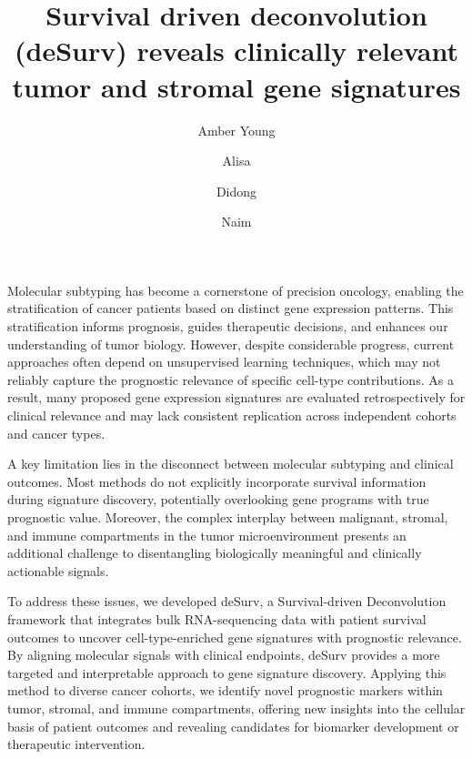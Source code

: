 \documentclass[9pt,twocolumn,twoside,]{pnas-new}
\title{Survival driven deconvolution (deSurv) reveals clinically
relevant tumor and stromal gene signatures}
\author[a,1,2]{Amber Young}
\author[b]{Alisa}
\author[a]{Didong}
\author[a,c]{Naim}
\affil[a]{University of North Carolina at Chapel Hill, Department,
Street, City, State, Zip}
\affil[b]{Another University Department, Street, City, State, Zip}
\begin{document}
\verticaladjustment{-2pt}



\maketitle
\thispagestyle{firststyle}



Molecular subtyping has become a cornerstone of precision oncology,
enabling the stratification of cancer patients based on distinct gene
expression patterns. This stratification informs prognosis, guides
therapeutic decisions, and enhances our understanding of tumor biology.
However, despite considerable progress, current approaches often depend
on unsupervised learning techniques, which may not reliably capture the
prognostic relevance of specific cell-type contributions. As a result,
many proposed gene expression signatures are evaluated retrospectively
for clinical relevance and may lack consistent replication across
independent cohorts and cancer types.

A key limitation lies in the disconnect between molecular subtyping and
clinical outcomes. Most methods do not explicitly incorporate survival
information during signature discovery, potentially overlooking gene
programs with true prognostic value. Moreover, the complex interplay
between malignant, stromal, and immune compartments in the tumor
microenvironment presents an additional challenge to disentangling
biologically meaningful and clinically actionable signals.

To address these issues, we developed deSurv, a Survival-driven
Deconvolution framework that integrates bulk RNA-sequencing data with
patient survival outcomes to uncover cell-type-enriched gene signatures
with prognostic relevance. By aligning molecular signals with clinical
endpoints, deSurv provides a more targeted and interpretable approach to
gene signature discovery. Applying this method to diverse cancer
cohorts, we identify novel prognostic markers within tumor, stromal, and
immune compartments, offering new insights into the cellular basis of
patient outcomes and revealing candidates for biomarker development or
therapeutic intervention.
\end{document}
